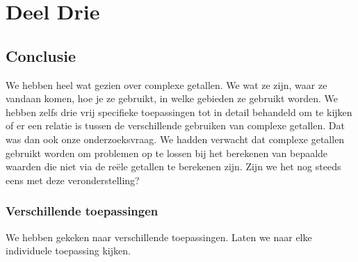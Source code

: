 \documentclass[11pt,fleqn]{book} %
\begin{document}
\part{Deel Drie}


\chapter{Conclusie}
We hebben heel wat gezien over complexe getallen. We wat ze zijn, waar ze vandaan komen, hoe je ze gebruikt, in welke gebieden ze gebruikt worden. We hebben zelfs drie vrij specifieke toepassingen tot in detail behandeld om te kijken of er een relatie is tussen de verschillende gebruiken van complexe getallen.
Dat was dan ook onze onderzoeksvraag. We hadden verwacht dat complexe getallen gebruikt worden om problemen op te lossen bij het berekenen van bepaalde waarden die niet via de reële getallen te berekenen zijn. Zijn we het nog steeds eens met deze veronderstelling?

\section{Verschillende toepassingen}
We hebben gekeken naar verschillende toepassingen. Laten we naar elke individuele toepassing kijken.
\end{document}
